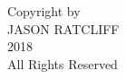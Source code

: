 \thispagestyle{empty}
\vspace*{\fill}         %
\begin{center}          
  Copyright by\\
  JASON RATCLIFF\\
  2018\\
  All Rights Reserved
\end{center}
\vspace*{\fill}
